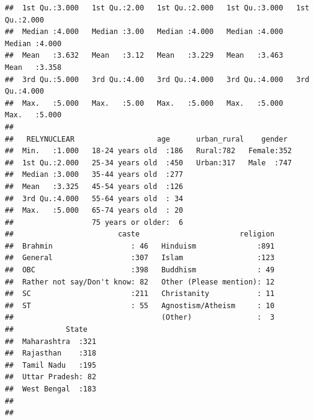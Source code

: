 \documentclass[
]{article}
\begin{document}
\begin{verbatim}
##  1st Qu.:3.000   1st Qu.:2.00   1st Qu.:2.000   1st Qu.:3.000   1st Qu.:2.000  
##  Median :4.000   Median :3.00   Median :4.000   Median :4.000   Median :4.000  
##  Mean   :3.632   Mean   :3.12   Mean   :3.229   Mean   :3.463   Mean   :3.358  
##  3rd Qu.:5.000   3rd Qu.:4.00   3rd Qu.:4.000   3rd Qu.:4.000   3rd Qu.:4.000  
##  Max.   :5.000   Max.   :5.00   Max.   :5.000   Max.   :5.000   Max.   :5.000  
##                                                                                
##   RELYNUCLEAR                   age      urban_rural    gender   
##  Min.   :1.000   18-24 years old  :186   Rural:782   Female:352  
##  1st Qu.:2.000   25-34 years old  :450   Urban:317   Male  :747  
##  Median :3.000   35-44 years old  :277                           
##  Mean   :3.325   45-54 years old  :126                           
##  3rd Qu.:4.000   55-64 years old  : 34                           
##  Max.   :5.000   65-74 years old  : 20                           
##                  75 years or older:  6                           
##                        caste                       religion  
##  Brahmin                  : 46   Hinduism              :891  
##  General                  :307   Islam                 :123  
##  OBC                      :398   Buddhism              : 49  
##  Rather not say/Don't know: 82   Other (Please mention): 12  
##  SC                       :211   Christanity           : 11  
##  ST                       : 55   Agnostism/Atheism     : 10  
##                                  (Other)               :  3  
##            State    
##  Maharashtra  :321  
##  Rajasthan    :318  
##  Tamil Nadu   :195  
##  Uttar Pradesh: 82  
##  West Bengal  :183  
##                     
## 
\end{verbatim}
\end{document}
